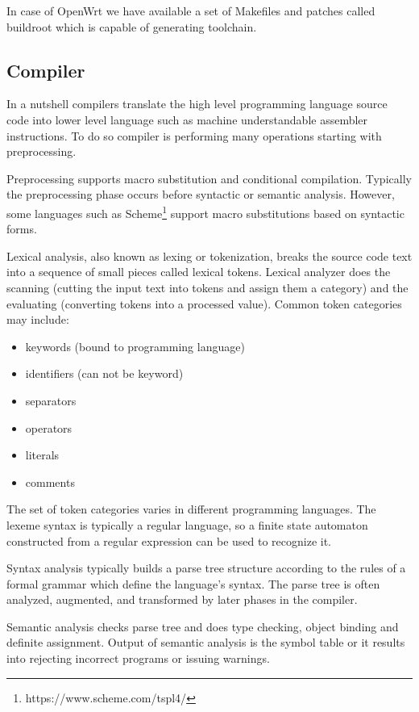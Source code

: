 In case of OpenWrt we have available a set of Makefiles and patches called buildroot which is capable of generating toolchain.

\subsection{Compiler}

In a nutshell compilers translate the high level programming language source code into lower level language such as machine understandable assembler instructions.
To do so compiler is performing many operations starting with preprocessing.

Preprocessing supports macro substitution and conditional compilation.
Typically the preprocessing phase occurs before syntactic or semantic analysis.
However, some languages such as Scheme\footnote{https://www.scheme.com/tspl4/} support macro substitutions based on syntactic forms.

Lexical analysis, also known as lexing or tokenization, breaks the source code text into a sequence of small pieces called lexical tokens.
Lexical analyzer does the scanning (cutting the input text into tokens and assign them a category) and the evaluating (converting tokens into a processed value).
Common token categories may include:
\begin{itemize}
    \item keywords (bound to programming language)
    \item identifiers (can not be keyword)
    \item separators
    \item operators
    \item literals
    \item comments
\end{itemize}
The set of token categories varies in different programming languages.
The lexeme syntax is typically a regular language, so a finite state automaton constructed from a regular expression can be used to recognize it.

Syntax analysis typically builds a parse tree structure according to the rules of a formal grammar which define the language's syntax.
The parse tree is often analyzed, augmented, and transformed by later phases in the compiler.

Semantic analysis checks parse tree and does type checking, object binding and definite assignment.
Output of semantic analysis is the symbol table or it results into rejecting incorrect programs or issuing warnings.

